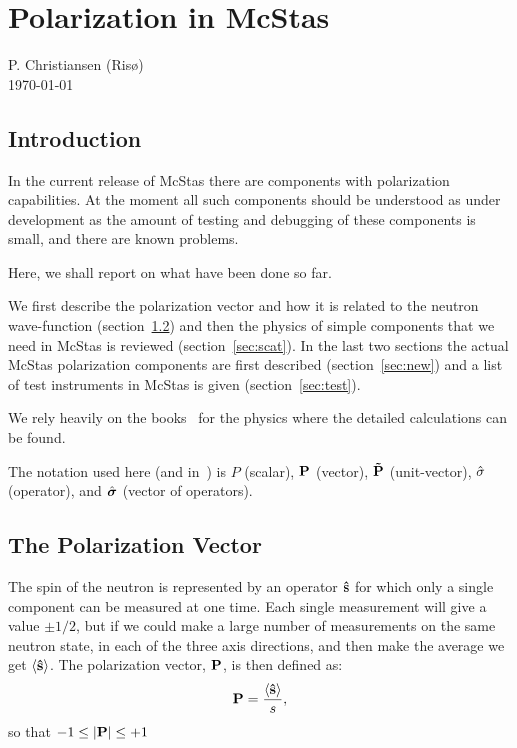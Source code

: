 
\chapter{Polarization in McStas}
\label{c:polarization}
\begin{center}
\Large{P. Christiansen (Ris{\o})\\\today}
\end{center}

\section{Introduction}

In the current release of McStas there are components with polarization
capabilities. At the moment all such components should be understood as under
development as the amount of testing and debugging of these components is
small, and there are known problems. 

Here, we shall report on what have been done so far.

We first describe the polarization vector and how it is related to the neutron
wave-function (section~\ref{sec:pol}) and then the physics of simple
components that we need in McStas is reviewed (section~\ref{sec:scat}). In the
last two sections the actual McStas polarization components are first
described (section~\ref{sec:new}) and a list of test instruments in McStas is
given (section~\ref{sec:test}).

We rely heavily on the books~\cite{lovesey,gavin} for the physics where
the detailed calculations can be found. 

The notation used here (and in~\cite{gavin}) is $P$ (scalar), $\mathbf{P}$
(vector), $\mathbf{\tilde{P}}$ (unit-vector), $\hat{\sigma}$ (operator), and $\hat{\mbox{\boldmath $\sigma$}}$
(vector of operators).

\section{The Polarization Vector}
\label{sec:pol}

The spin of the neutron is represented by an operator $\mathbf{\hat{s}}$ for which only a
single component can be measured at one time. Each single measurement will
give a value $\pm 1/2$, but if we could make a large number of measurements on
the same neutron state, in each of the three axis directions, and then make
the average we get $\langle \mathbf{\hat{s}} \rangle$. The polarization vector, $\mathbf{P}$, is
then defined as:
\begin{equation}
  \label{eq:pol_single}
  \mathbf{P} = \frac{\langle \mathbf{\hat{s}} \rangle}{s},
\end{equation}
so that $-1 \leq |\mathbf{P}| \leq +1$

